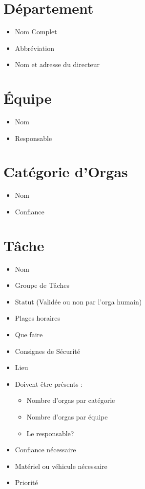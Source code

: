 \section{Département}
\begin{itemize}
 \item Nom Complet
\item Abbréviation
\item Nom et adresse du directeur

\end{itemize}

\section{Équipe}
\begin{itemize}
 \item Nom
\item Responsable

\end{itemize}



\section{Catégorie d'Orgas}
\begin{itemize}
 \item Nom
\item Confiance

\end{itemize}

\section{Tâche}
\begin{itemize}
 \item Nom
\item Groupe de Tâches
\item Statut (Validée ou non par l'orga humain)
\item Plages horaires 
\item Que faire
\item Consignes de Sécurité
\item Lieu

\item Doivent être présents : \begin{itemize}
                               \item Nombre d'orgas par catégorie
                               \item Nombre d'orgas par équipe
			       \item Le responsable?
                              \end{itemize}
\item Confiance nécessaire
\item Matériel ou véhicule nécessaire
\item Priorité

\end{itemize}

